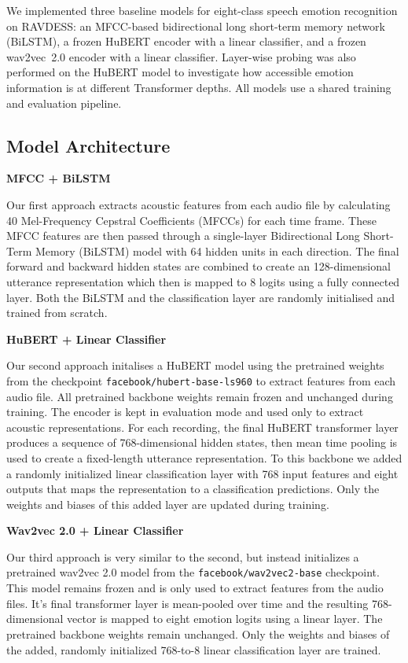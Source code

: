 \documentclass[11pt, letterpaper]{article}
\begin{document}
We implemented three baseline models for eight-class speech emotion recognition on RAVDESS: an MFCC-based bidirectional long short-term memory network (BiLSTM), a frozen HuBERT encoder with a linear classifier, and a frozen wav2vec~2.0 encoder with a linear classifier. Layer-wise probing was also performed on the HuBERT model to investigate how accessible emotion information is at different Transformer depths. All models use a shared training and evaluation pipeline.

\subsection{Model Architecture}

\textbf{MFCC + BiLSTM}

Our first approach extracts acoustic features from each audio file by calculating 40 Mel-Frequency Cepstral Coefficients (MFCCs) for each time frame. These MFCC features are then passed through a single-layer Bidirectional Long Short-Term Memory (BiLSTM) model with 64 hidden units in each direction. The final forward and backward hidden states are combined to create an 128-dimensional utterance representation which then is mapped to 8 logits using a fully connected layer. Both the BiLSTM and the classification layer are randomly initialised and trained from scratch.

\textbf{HuBERT + Linear Classifier}

Our second approach initalises a HuBERT model using the pretrained weights from the checkpoint \texttt{facebook/hubert-base-ls960} to extract features from each audio file. All pretrained backbone weights remain frozen and unchanged during training. The encoder is kept in evaluation mode and used only to extract acoustic representations. For each recording, the final HuBERT  transformer layer produces a sequence of 768-dimensional hidden states, then mean time pooling is used to create a fixed-length utterance representation. To this backbone we added a randomly initialized linear classification layer with 768 input features and eight outputs that maps the representation to a classification predictions. Only the weights and biases of this added layer are updated during training.

\textbf{Wav2vec 2.0 + Linear Classifier}

Our third approach is very similar to the second, but instead initializes a pretrained wav2vec 2.0 model from the \texttt{facebook/wav2vec2-base} checkpoint. This model remains frozen and is only used to extract features from the audio files. It's final transformer layer is mean-pooled over time and the resulting 768-dimensional vector is mapped to eight emotion logits using a linear layer. The pretrained backbone weights remain unchanged. Only the weights and biases of the added, randomly initialized 768-to-8 linear classification layer are trained.
\end{document}
